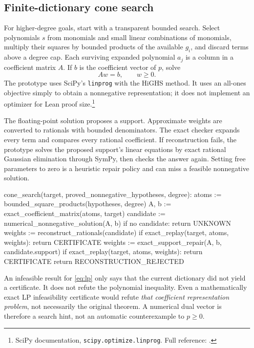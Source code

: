 \documentclass[11pt,letterpaper]{article}
\newcommand{\Lean}{\textsf{Lean}}
\newcommand{\src}[2]{\footnote{#2. Full reference: \cite{#1}.}}
\theoremstyle{definition}
\theoremstyle{remark}
\begin{document}
\subsection{Finite-dictionary cone search}
For higher-degree goals, start with a transparent bounded search. Select polynomials $s$ from monomials and small linear combinations of monomials, multiply their squares by bounded products of the available $g_i$, and discard terms above a degree cap. Each surviving expanded polynomial $a_j$ is a column in a coefficient matrix $A$. If $b$ is the coefficient vector of $p$, solve
\begin{equation}\label{eq:lp}
Aw=b,\qquad w\geq0.
\end{equation}
The prototype uses SciPy's \texttt{linprog} with the HiGHS method. It uses an all-ones objective simply to obtain a nonnegative representation; it does not implement an optimizer for \Lean{} proof size.\src{scipy}{SciPy documentation, \texttt{scipy.optimize.linprog}}

The floating-point solution proposes a support. Approximate weights are converted to rationals with bounded denominators. The exact checker expands every term and compares every rational coefficient. If reconstruction fails, the prototype solves the proposed support's linear equations by exact rational Gaussian elimination through SymPy, then checks the answer again. Setting free parameters to zero is a heuristic repair policy and can miss a feasible nonnegative solution.

\begin{code}
cone_search(target, proved_nonnegative_hypotheses, degree):
  atoms := bounded_square_products(hypotheses, degree)
  A, b := exact_coefficient_matrix(atoms, target)
  candidate := numerical_nonnegative_solution(A, b)
  if no candidate: return UNKNOWN
  weights := reconstruct_rationals(candidate)
  if exact_replay(target, atoms, weights): return CERTIFICATE
  weights := exact_support_repair(A, b, candidate.support)
  if exact_replay(target, atoms, weights): return CERTIFICATE
  return RECONSTRUCTION_REJECTED
\end{code}
An infeasible result for \eqref{eq:lp} only says that the current dictionary did not yield a certificate. It does not refute the polynomial inequality. Even a mathematically exact LP infeasibility certificate would refute \emph{that coefficient representation problem}, not necessarily the original theorem. A numerical dual vector is therefore a search hint, not an automatic counterexample to $p\geq0$.
\end{document}
